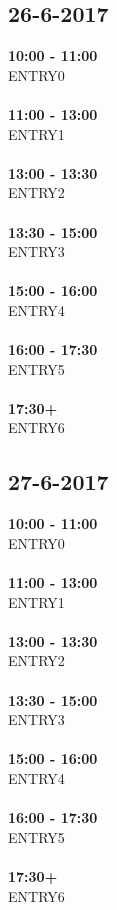 \documentclass{uva-inf-article}
\begin{document}
\subsection{26-6-2017}
\textbf{10:00 - 11:00}\\
ENTRY0\\\\
\textbf{11:00 - 13:00}\\
ENTRY1\\\\
\textbf{13:00 - 13:30}\\
ENTRY2\\\\
\textbf{13:30 - 15:00}\\
ENTRY3\\\\
\textbf{15:00 - 16:00}\\
ENTRY4\\\\
\textbf{16:00 - 17:30}\\
ENTRY5\\\\
\textbf{17:30+}\\
ENTRY6\\
\subsection{27-6-2017}
\textbf{10:00 - 11:00}\\
ENTRY0\\\\
\textbf{11:00 - 13:00}\\
ENTRY1\\\\
\textbf{13:00 - 13:30}\\
ENTRY2\\\\
\textbf{13:30 - 15:00}\\
ENTRY3\\\\
\textbf{15:00 - 16:00}\\
ENTRY4\\\\
\textbf{16:00 - 17:30}\\
ENTRY5\\\\
\textbf{17:30+}\\
ENTRY6\\
\end{document}
